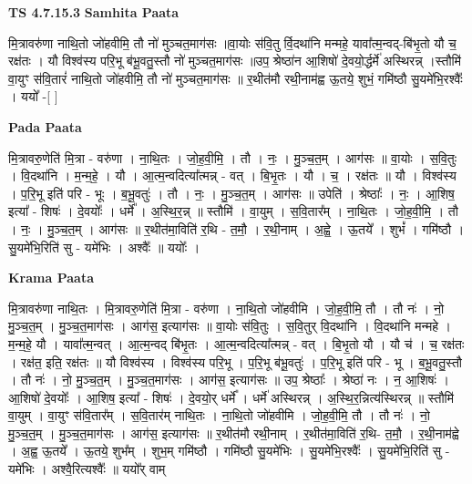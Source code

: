 \documentclass[17pt]{extarticle}
\begin{document}
\textbf{TS 4.7.15.3 } \newline
\textbf{Samhita Paata} \newline

मि॒त्रावरु॑णा नाथि॒तो जो॑हवीमि॒ तौ नो॑ मुञ्चत॒माग॑सः ॥वा॒योः स॑वि॒तु र्वि॒दथा॑नि मन्महे॒ यावा᳚त्म॒न्वद्-बि॑भृ॒तो यौ च॒ रक्ष॑तः । यौ विश्व॑स्य परि॒भू ब॑भू॒वतु॒स्तौ नो॑ मुञ्चत॒माग॑सः ॥उप॒ श्रेष्ठा॑न आ॒शिषो॑ दे॒वयो॒र्द्धर्मे॑ अस्थिरन्न् ।स्तौमि॑ वा॒युꣳ स॑वि॒तारं॑ नाथि॒तो जो॑हवीमि॒ तौ नो॑ मुञ्चत॒माग॑सः ॥ र॒थीत॑मौ रथी॒नाम॑ह्व ऊ॒तये॒ शुभं॒ गमि॑ष्ठौ सु॒यमे॑भि॒रश्वैः᳚ । ययो᳚ -[  ] \newline

\textbf{Pada Paata} \newline

मि॒त्रावरु॒णेति॑ मि॒त्रा - वरु॑णा । ना॒थि॒तः । जो॒ह॒वी॒मि॒ । तौ । नः॒ । मु॒ञ्च॒त॒म् । आग॑सः ॥ वा॒योः । स॒वि॒तुः । वि॒दथा॑नि । म॒न्म॒हे॒ । यौ । आ॒त्म॒न्वदित्या᳚त्मन्न् - वत् । बि॒भृ॒तः । यौ । च॒ । रक्ष॑तः ॥ यौ । विश्व॑स्य । प॒रि॒भू इति॑ परि - भूः । ब॒भू॒वतुः॑ । तौ । नः॒ । मु॒ञ्च॒त॒म् । आग॑सः ॥ उपेति॑ । श्रेष्ठाः᳚ । नः॒ । आ॒शिष॒ इत्या᳚ - शिषः॑ । दे॒वयोः᳚ । धर्मे᳚ । अ॒स्थि॒र॒न्न् ॥ स्तौमि॑ । वा॒युम् । स॒वि॒तार᳚म् । ना॒थि॒तः । जो॒ह॒वी॒मि॒ । तौ । नः॒ । मु॒ञ्च॒त॒म् । आग॑सः ॥ र॒थीत॑मा॒विति॑ र॒थि - त॒मौ॒ । र॒थी॒नाम् । अ॒ह्वे॒ । ऊ॒तये᳚ । शुभं᳚ । गमि॑ष्ठौ । सु॒यमे॑भि॒रिति॑ सु - यमे॑भिः । अश्वैः᳚ ॥ ययोः᳚ ।  \newline


\textbf{Krama Paata} \newline

मि॒त्रावरु॑णा नाथि॒तः । मि॒त्रावरु॒णेति॑ मि॒त्रा - वरु॑णा । ना॒थि॒तो जो॑हवीमि । जो॒ह॒वी॒मि॒ तौ । तौ नः॑ । नो॒ मु॒ञ्च॒त॒म् । मु॒ञ्च॒त॒माग॑सः । आग॑स॒ इत्याग॑सः ॥ वा॒योः स॑वि॒तुः । स॒वि॒तुर् वि॒दथा॑नि । वि॒दथा॑नि मन्महे । म॒न्म॒हे॒ यौ । यावा᳚त्म॒न्वत् । आ॒त्म॒न्वद् बि॑भृ॒तः । आ॒त्म॒न्वदित्या᳚त्मन्न् - वत् । बि॒भृ॒तो यौ । यौ च॑ । च॒ रक्ष॑तः । रक्ष॑त॒ इति॒ रक्ष॑तः ॥ यौ विश्व॑स्य । विश्व॑स्य परि॒भू । प॒रि॒भू ब॑भू॒वतुः॑ । प॒रि॒भू इति॑ परि - भू । ब॒भू॒वतु॒स्तौ । तौ नः॑ । नो॒ मु॒ञ्च॒त॒॒म् । मु॒ञ्च॒त॒माग॑सः । आग॑स॒ इत्याग॑सः ॥ उप॒ श्रेष्ठाः᳚ । श्रेष्ठा॑ नः । न॒ आ॒शिषः॑ । आ॒शिषो॑ दे॒वयोः᳚ । आ॒शिष॒ इत्या᳚ - शिषः॑ । दे॒वयो॒र् धर्मे᳚ । धर्मे॑ अस्थिरन्न् । अ॒स्थि॒र॒न्नित्य॑स्थिरन्न् ॥ स्तौमि॑ वा॒युम् । वा॒युꣳ स॑वि॒तार᳚म् । स॒वि॒तार॑म् नाथि॒तः । ना॒थि॒तो जो॑हवीमि । जो॒ह॒वी॒मि॒ तौ । तौ नः॑ । नो॒ मु॒ञ्च॒त॒॒म् । मु॒ञ्च॒त॒माग॑सः । आग॑स॒ इत्याग॑सः ॥ र॒थीत॑मौ रथी॒नाम् । र॒थीत॑मा॒विति॑ र॒थि- त॒मौ॒ । र॒थी॒नाम॑ह्वे । अ॒ह्व॒ ऊ॒तये᳚ । ऊ॒तये॒ शुभ᳚म् । शुभ॒म् गमि॑ष्ठौ । गमि॑ष्ठौ सु॒यमे॑भिः । सु॒यमे॑भि॒रश्वैः᳚ । सु॒यमे॑भि॒रिति॑ सु - यमे॑भिः । अश्वै॒रित्यश्वैः᳚ ॥ ययो᳚र् वाम् \newline
\end{document}
